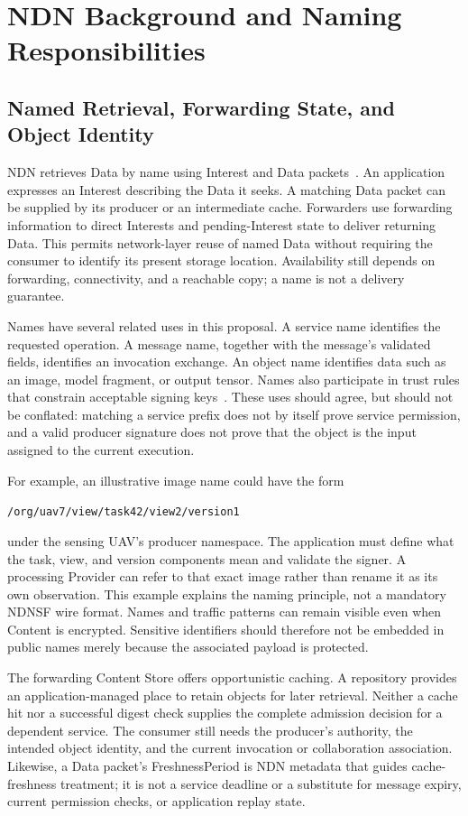 \section{NDN Background and Naming Responsibilities}
\subsection{Named Retrieval, Forwarding State, and Object Identity}
NDN retrieves Data by name using Interest and Data packets~\cite{ndn,ndnpacket}. An application expresses an Interest describing the Data it seeks. A matching Data packet can be supplied by its producer or an intermediate cache. Forwarders use forwarding information to direct Interests and pending-Interest state to deliver returning Data. This permits network-layer reuse of named Data without requiring the consumer to identify its present storage location. Availability still depends on forwarding, connectivity, and a reachable copy; a name is not a delivery guarantee.

Names have several related uses in this proposal. A service name identifies the requested operation. A message name, together with the message's validated fields, identifies an invocation exchange. An object name identifies data such as an image, model fragment, or output tensor. Names also participate in trust rules that constrain acceptable signing keys~\cite{trustschema}. These uses should agree, but should not be conflated: matching a service prefix does not by itself prove service permission, and a valid producer signature does not prove that the object is the input assigned to the current execution.

For example, an illustrative image name could have the form
\begin{center}\texttt{/org/uav7/view/task42/view2/version1}\end{center}
under the sensing UAV's producer namespace. The application must define what the task, view, and version components mean and validate the signer. A processing Provider can refer to that exact image rather than rename it as its own observation. This example explains the naming principle, not a mandatory NDNSF wire format. Names and traffic patterns can remain visible even when Content is encrypted. Sensitive identifiers should therefore not be embedded in public names merely because the associated payload is protected.

The forwarding Content Store offers opportunistic caching. A repository provides an application-managed place to retain objects for later retrieval. Neither a cache hit nor a successful digest check supplies the complete admission decision for a dependent service. The consumer still needs the producer's authority, the intended object identity, and the current invocation or collaboration association. Likewise, a Data packet's FreshnessPeriod is NDN metadata that guides cache-freshness treatment; it is not a service deadline or a substitute for message expiry, current permission checks, or application replay state.

